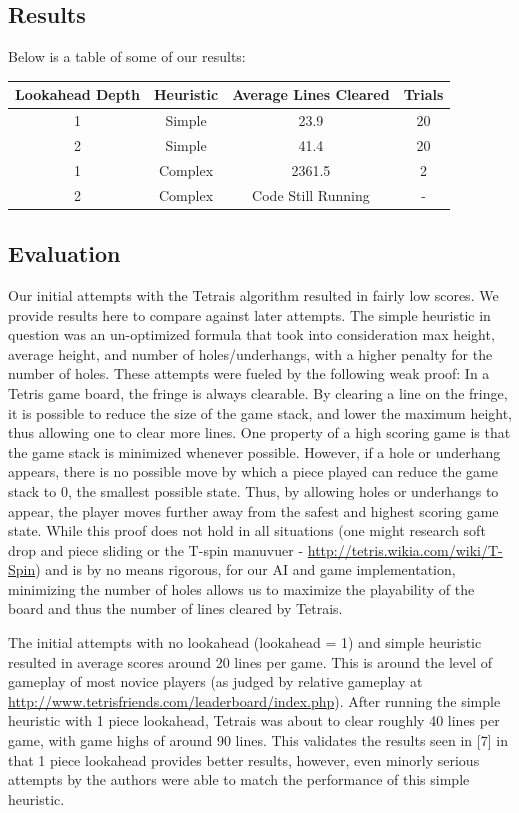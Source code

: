 \documentclass[11pt]{article}
\begin{document}
\subsection{Results}
Below is a table of some of our results:\vspace{2em}

\begin{tabular}{|c|c|c|c|}\hline
Lookahead Depth & Heuristic & Average Lines Cleared & Trials\\ \hline
1 & Simple & 23.9 & 20\\ \hline
2 & Simple & 41.4 & 20\\ \hline
1 & Complex & 2361.5 & 2\\ \hline
2 & Complex & Code Still Running & -\\ \hline
\end{tabular}

\subsection{Evaluation}
Our initial attempts with the Tetrais algorithm resulted in fairly low scores. We provide results here to compare against later attempts. The simple heuristic in question was an un-optimized formula that took into consideration max height, average height, and number of holes/underhangs, with a higher penalty for the number of holes. These attempts were fueled by the following weak proof: In a Tetris game board, the fringe is always clearable. By clearing a line on the fringe, it is possible to reduce the size of the game stack, and lower the maximum height, thus allowing one to clear more lines. One property of a high scoring game is that the game stack is minimized whenever possible. However, if a hole or underhang appears, there is no possible move by which a piece played can reduce the game stack to 0, the smallest possible state. Thus, by allowing holes or underhangs to appear, the player moves further away from the safest and highest scoring game state. While this proof does not hold in all situations (one might research soft drop and piece sliding or the T-spin manuvuer - \url{http://tetris.wikia.com/wiki/T-Spin}) and is by no means rigorous, for our AI and game implementation, minimizing the number of holes allows us to maximize the playability of the board and thus the number of lines cleared by Tetrais.

The initial attempts with no lookahead (lookahead = 1) and simple heuristic resulted in average scores around 20 lines per game. This is around the level of gameplay of most novice players (as judged by relative gameplay at \url{http://www.tetrisfriends.com/leaderboard/index.php}). After running the simple heuristic with 1 piece lookahead, Tetrais was about to clear roughly 40 lines per game, with game highs of around 90 lines. This validates the results seen in [7] in that 1 piece lookahead provides better results, however, even minorly serious attempts by the authors were able to match the performance of this simple heuristic. 
\end{document}
